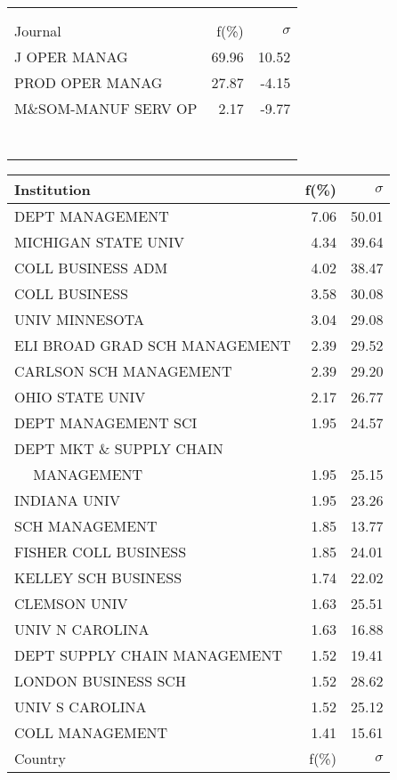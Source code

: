 \documentclass[a4paper,11pt]{report}
\begin{document}
\begin{landscape}
\begin{table}[!ht]
{\begin{tabular}{|l r  r|}
 &  & \\
 &  & \\
\hline
\hline
Journal & f(\%) & $\sigma$\\
\hline
J OPER MANAG & 69.96 & 10.52\\
PROD OPER MANAG & 27.87 & -4.15\\
M\&SOM-MANUF SERV OP & 2.17 & -9.77\\
 &  & \\
 &  & \\
 &  & \\
 &  & \\
 &  & \\
 &  & \\
 &  & \\
\hline
\end{tabular}
}
{\scriptsize\begin{tabular}{|l r r|}
\hline
Institution & f(\%) & $\sigma$\\
\hline
DEPT MANAGEMENT & 7.06 & 50.01\\
MICHIGAN STATE UNIV & 4.34 & 39.64\\
COLL BUSINESS ADM & 4.02 & 38.47\\
COLL BUSINESS & 3.58 & 30.08\\
UNIV MINNESOTA & 3.04 & 29.08\\
ELI BROAD GRAD SCH MANAGEMENT & 2.39 & 29.52\\
CARLSON SCH MANAGEMENT & 2.39 & 29.20\\
OHIO STATE UNIV & 2.17 & 26.77\\
DEPT MANAGEMENT SCI & 1.95 & 24.57\\
DEPT MKT \& SUPPLY CHAIN &  & \\
$\quad$ MANAGEMENT & 1.95 & 25.15\\
INDIANA UNIV & 1.95 & 23.26\\
SCH MANAGEMENT & 1.85 & 13.77\\
FISHER COLL BUSINESS & 1.85 & 24.01\\
KELLEY SCH BUSINESS & 1.74 & 22.02\\
CLEMSON UNIV & 1.63 & 25.51\\
UNIV N CAROLINA & 1.63 & 16.88\\
DEPT SUPPLY CHAIN MANAGEMENT & 1.52 & 19.41\\
LONDON BUSINESS SCH & 1.52 & 28.62\\
UNIV S CAROLINA & 1.52 & 25.12\\
COLL MANAGEMENT & 1.41 & 15.61\\
\hline
\hline
Country & f(\%) & $\sigma$\\

\end{tabular}}
\end{table}
\end{landscape}
\end{document}
